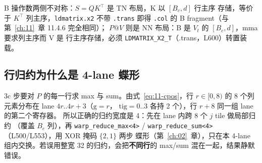 B 操作数两侧不对称：$S=QK^\top$ 是 TN 布局，K 以 $[B_c,d]$ 行主序
存储，等价于 $K^\top$ 列主序，\texttt{ldmatrix.x2} 不带 \texttt{.trans}
即得 \texttt{.col} 的 B fragment（与第~\ref{ch:11}~章 11.4.6 完全相同）；
$P@V$ 则是 NN 布局：B 是 $V_t$ 的 $[B_c,d]$，mma 要求列主序而 V 是
行主序存储，必须 \texttt{LDMATRIX\_\allowbreak{}X2\_\allowbreak{}T}（.trans，L600）转置装载。

\subsection{行归约为什么是 4-lane 蝶形}

3c 步要对 $P$ 的每一行求 max 与 sum。由式~\ref{eq:11-cpos}，行
$r\in[0,8)$ 的 8 个列元素分布在 lane $4r..4r{+}3$（$\mathrm{g}=r$，
$\mathrm{tig}=0..3$ 各持 2 个），行 $r{+}8$ 同一组 lane 的第二个寄存器。
所以正确的归约宽度是 4：先在 lane 内跨 8 个 $j$ tile 做局部归约
（覆盖 $B_c$ 列），再 \texttt{warp\_\allowbreak{}reduce\_\allowbreak{}max\allowbreak{}<4>} /
\texttt{warp\_\allowbreak{}reduce\_\allowbreak{}sum\allowbreak{}<4>}（L500/L553），用 XOR 掩码 $\{2,1\}$ 两步
蝶形（第~\ref{ch:02}~章），只在本 4-lane 组内交换。若误用整宽 32
的归约，会把\textbf{不同行}的 max/sum 混在一起，结果静默错误。

